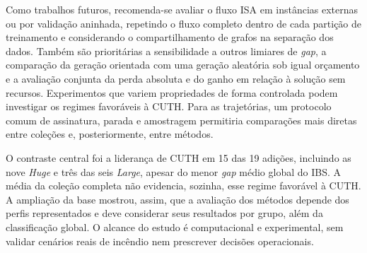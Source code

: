 Como trabalhos futuros, recomenda-se avaliar o fluxo ISA em instâncias
externas ou por validação aninhada, repetindo o fluxo completo dentro de
cada partição de treinamento e considerando o compartilhamento de
grafos na separação dos dados. Também são prioritárias a sensibilidade
a outros limiares de \textit{gap}, a comparação da geração orientada com
uma geração aleatória sob igual orçamento e a avaliação conjunta da perda
absoluta e do ganho em relação à solução sem recursos. Experimentos que
variem propriedades de forma controlada podem investigar os regimes
favoráveis à CUTH. Para as trajetórias, um protocolo comum de assinatura,
parada e amostragem permitiria comparações mais diretas entre coleções e,
posteriormente, entre métodos.

O contraste central foi a liderança de CUTH em 15 das 19 adições,
incluindo as nove \textit{Huge} e três das seis \textit{Large}, apesar
do menor \textit{gap} médio global do IBS. A média da coleção completa
não evidencia, sozinha, esse regime favorável à CUTH. A ampliação da
base mostrou, assim, que a avaliação dos métodos depende dos perfis
representados e deve considerar seus resultados por grupo, além da
classificação global.
O alcance do estudo é computacional e experimental, sem validar cenários
reais de incêndio nem prescrever decisões operacionais.
